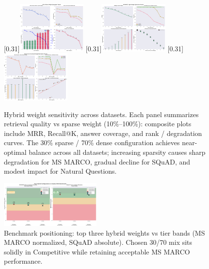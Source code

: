 \documentclass[11pt]{article}
\begin{document}
\begin{figure}[htbp]
\centering
{}[0.31\textwidth]{\includegraphics[width=0.31\textwidth]{images/evaluation_images/squad_hybrid_optimization.png}}\hfill
{}[0.31\textwidth]{\includegraphics[width=0.31\textwidth]{images/evaluation_images/ms_marco_hybrid_optimization.png}}\hfill
{}[0.31\textwidth]{\includegraphics[width=0.31\textwidth]{images/evaluation_images/natural_questions_hybrid_optimization.png}}
\caption{Hybrid weight sensitivity across datasets. Each panel summarizes retrieval quality vs sparse weight (10\%--100\%): composite plots include MRR, Recall@K, answer coverage, and rank / degradation curves. The 30\% sparse / 70\% dense configuration achieves near-optimal balance across all datasets; increasing sparsity causes sharp degradation for MS MARCO, gradual decline for SQuAD, and modest impact for Natural Questions.}
\label{fig:hybrid_performance}
\end{figure}

\begin{figure}[htbp]
\centering
\begingroup
\captionsetup{font=small}
\includegraphics[width=0.45\textwidth]{images/evaluation_images/industry_benchmark_comparison.png}
\caption{Benchmark positioning: top three hybrid weights vs tier bands (MS MARCO normalized, SQuAD absolute). Chosen 30/70 mix sits solidly in Competitive while retaining acceptable MS MARCO performance.}
\label{fig:industry_benchmark}
\endgroup
\end{figure}
\end{document}

